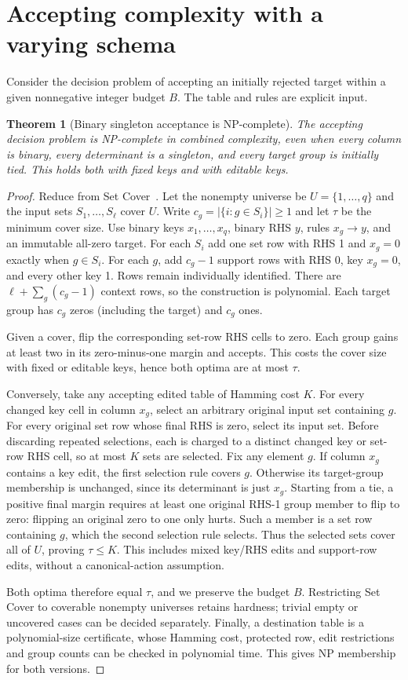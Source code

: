 \documentclass[11pt]{article}
\newtheorem{theorem}{Theorem}
\begin{document}
\section{Accepting complexity with a varying schema}
Consider the decision problem of accepting an initially rejected target within
a given nonnegative integer budget $B$. The table and rules are explicit input.
\begin{theorem}[Binary singleton acceptance is NP-complete]\label{thm:hardness}
The accepting decision problem is NP-complete in combined complexity, even
when every column is binary, every determinant is a singleton, and every target
group is initially tied. This holds both with fixed keys and with editable keys.
\end{theorem}
\begin{proof}
Reduce from Set Cover~\cite{karp}. Let the nonempty universe be
$U=\{1,\ldots,q\}$ and the input sets $S_1,\ldots,S_\ell$ cover $U$.
Write $c_g=|\{i:g\in S_i\}|\geq1$ and let $\tau$ be the minimum cover size.
Use binary keys $x_1,\ldots,x_q$, binary RHS $y$, rules $x_g\to y$, and an
immutable all-zero target. For each $S_i$ add one set row with RHS 1 and
$x_g=0$ exactly when $g\in S_i$. For each $g$, add $c_g-1$ support rows with
RHS 0, key $x_g=0$, and every other key 1. Rows remain individually identified.
There are $\ell+\sum_g(c_g-1)$ context rows, so the construction is polynomial.
Each target group has $c_g$ zeros (including the target) and $c_g$ ones.

Given a cover, flip the corresponding set-row RHS cells to zero. Each group
gains at least two in its zero-minus-one margin and accepts. This costs the
cover size with fixed or editable keys, hence both optima are at most $\tau$.

Conversely, take any accepting edited table of Hamming cost $K$. For every
changed key cell in column $x_g$, select an arbitrary original input set
containing $g$. For every original set row whose final RHS is zero, select
its input set. Before discarding repeated selections, each is charged to a
distinct changed key or set-row RHS cell, so at most $K$ sets are selected.
Fix any element $g$. If column $x_g$ contains a key edit, the first selection
rule covers $g$. Otherwise its target-group membership is unchanged, since
its determinant is just $x_g$. Starting from a tie, a positive final margin
requires at least one original RHS-1 group member to flip to zero: flipping
an original zero to one only hurts. Such a member is a set row containing $g$,
which the second selection rule selects. Thus the selected sets cover all of
$U$, proving $\tau\leq K$. This includes mixed key/RHS edits and support-row
edits, without a canonical-action assumption.

Both optima therefore equal $\tau$, and we preserve the budget $B$.
Restricting Set Cover to coverable nonempty universes retains hardness;
trivial empty or uncovered cases can be decided separately. Finally, a
destination table is a polynomial-size certificate, whose Hamming cost,
protected row, edit restrictions and group counts can be checked in polynomial
time. This gives NP membership for both versions.
\end{proof}
\end{document}
